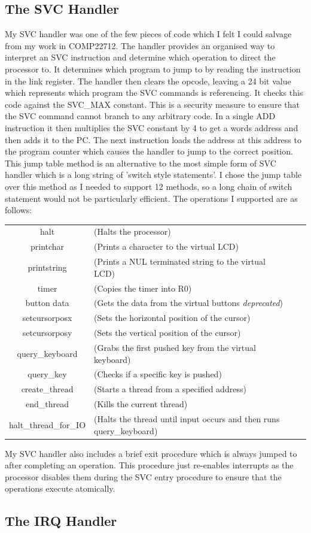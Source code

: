 \subsection{The SVC Handler}
My SVC handler was one of the few pieces of code which I felt I could salvage from my work in COMP22712. The handler provides an organised way to interpret an SVC instruction and determine which operation to direct the processor to. It determines which program to jump to by reading the instruction in the link register. The handler then clears the opcode, leaving a 24 bit value which represents which program the SVC commands is referencing. It checks this code against the SVC\_MAX constant. This is a security measure to ensure that the SVC command cannot branch to any arbitrary code. In a single ADD instruction it then multiplies the SVC constant by 4 to get a words address and then adds it to the PC. The next instruction loads the address at this address to the program counter which causes the handler to jump to the correct position. This jump table method is an alternative to the most simple form of SVC handler which is a long string of 'switch style statements'. I chose the jump table over this method as I needed to support 12 methods, so a long chain of switch statement would not be particularly efficient. The operations I supported are as follows:

\begin{tabular}{cl cl}
	halt & (Halts the processor) \\
	printchar & (Prints a character to the virtual LCD) \\
	printstring & (Prints a NUL terminated string to the virtual LCD) \\
	timer & (Copies the timer into R0) \\
	button data  & (Gets the data from the virtual buttons \textit{deprecated}) \\
	setcursorposx & (Sets the horizontal position of the cursor) \\
	setcursorposy & (Sets the vertical position of the cursor) \\
	query\_keyboard & (Grabs the first pushed key from the virtual keyboard) \\
	query\_key & (Checks if a specific key is pushed) \\
	create\_thread & (Starts a thread from a specified address) \\
	end\_thread & (Kills the current thread) \\
	halt\_thread\_for\_IO & (Halts the thread until input occurs and then runs query\_keyboard) \\
\end{tabular} 

My SVC handler also includes a brief exit procedure which is always jumped to after completing an operation. This procedure just re-enables interrupts as the processor disables them during the SVC entry procedure to ensure that the operations execute atomically. 
\subsection{The IRQ Handler}
